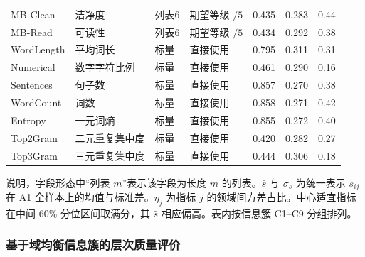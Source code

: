 \documentclass[bwprint]{gmcmthesis}
\newcommand{\TableNote}[2][0.96\textwidth]{%
    \vspace{0.25em}\par
    \begin{minipage}{#1}
    \normalsize\raggedright #2
    \end{minipage}
}
\begin{document}
\begin{table}[htbp]
\begin{tabular}{@{}P{2.4cm} C{2.6cm} C{1.7cm} C{3cm} C{1.10cm} C{1.20cm} C{1.20cm}@{}}
        MB-Clean    & 洁净度     & 列表6  & 期望等级 $/5$                            & 0.435     & 0.283        & 0.44     \\
        MB-Read     & 可读性     & 列表6  & 期望等级 $/5$                            & 0.434     & 0.292        & 0.38     \\
        WordLength  & 平均词长    & 标量   & 直接使用                                 & 0.795     & 0.311        & 0.31     \\
        Numerical   & 数字字符比例  & 标量   & 直接使用                                 & 0.461     & 0.290        & 0.16     \\
        Sentences   & 句子数     & 标量   & 直接使用                                 & 0.857     & 0.270        & 0.38     \\
        WordCount   & 词数      & 标量   & 直接使用                                 & 0.858     & 0.271        & 0.42     \\
        Entropy     & 一元词熵    & 标量   & 直接使用                                 & 0.855     & 0.272        & 0.40     \\
        Top2Gram    & 二元重复集中度 & 标量   & 直接使用                                 & 0.420     & 0.282        & 0.27     \\
        Top3Gram    & 三元重复集中度 & 标量   & 直接使用                                 & 0.444     & 0.306        & 0.18     \\
        \bottomrule
    \end{tabular}
    \TableNote[0.94\textwidth]{\footnotesize{\quad\quad 说明，字段形态中“列表 $m$”表示该字段为长度 $m$ 的列表。$\bar{s}$ 与 $\sigma_s$ 为统一表示 $s_{ij}$ 在 A1 全样本上的均值与标准差。$\eta_j$ 为指标 $j$ 的领域间方差占比。中心适宜指标在中间 60\% 分位区间取满分，其 $\bar{s}$ 相应偏高。表内按信息簇 C1--C9 分组排列。}}
\end{table}

\subsubsection{基于域均衡信息簇的层次质量评价}
\end{document}

